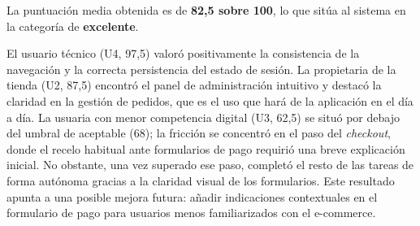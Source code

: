 \begin{table}[H]
\centering
\small
{}
\caption{Respuestas individuales y puntuaciones SUS.}
\label{tab:sus}
\end{table}

La puntuación media obtenida es de \textbf{82,5 sobre 100}, lo que sitúa al sistema en la categoría de \textbf{excelente}.

El usuario técnico (U4, 97,5) valoró positivamente la consistencia de la navegación y la correcta persistencia del estado de sesión. La propietaria de la tienda (U2, 87,5) encontró el panel de administración intuitivo y destacó la claridad en la gestión de pedidos, que es el uso que hará de la aplicación en el día a día. La usuaria con menor competencia digital (U3, 62,5) se situó por debajo del umbral de aceptable (68); la fricción se concentró en el paso del \textit{checkout}, donde el recelo habitual ante formularios de pago requirió una breve explicación inicial. No obstante, una vez superado ese paso, completó el resto de las tareas de forma autónoma gracias a la claridad visual de los formularios. Este resultado apunta a una posible mejora futura: añadir indicaciones contextuales en el formulario de pago para usuarios menos familiarizados con el e-commerce.
